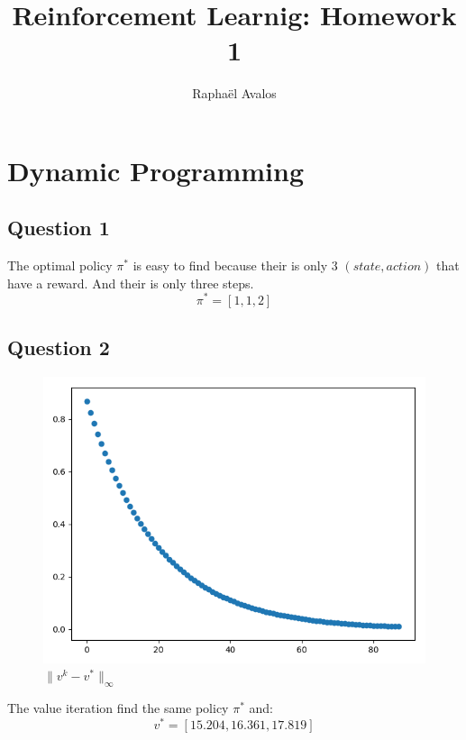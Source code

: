 \documentclass[10pt,a4paper]{article}
\author{Raphaël Avalos}
\title{Reinforcement Learnig: Homework 1}
\begin{document}
\maketitle
\section{Dynamic Programming}
\subsection{Question 1}
The optimal policy $\pi^*$ is easy to find because their is only 3 $(state,action)$ that have a reward. And their is only three steps.
$$ \pi^* = [1, 1, 2] $$
\subsection{Question 2}
\begin{figure}[h]
\centering
\caption{$\parallel v^k - v^* \parallel_{\infty}$}
\includegraphics[scale=.35]{q1.png}
\end{figure}
The value iteration find the same policy $\pi^*$ and:
$$ v^* = [15.204, 16.361, 17.819] $$
\end{document}
